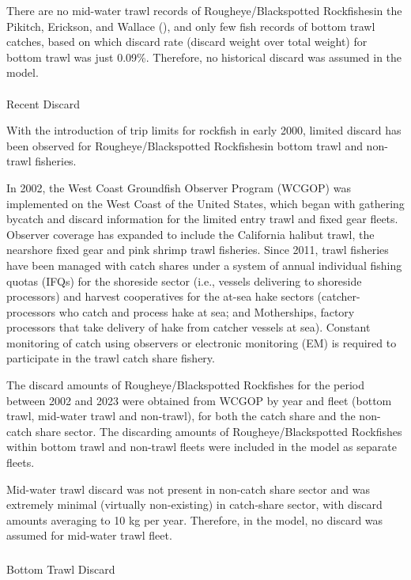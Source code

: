 \documentclass[
]{scrartcl}
\makeatletter
\let\oldparagraph\paragraph
\renewcommand{\paragraph}{
    \@ifstar
      \xxxParagraphStar
      \xxxParagraphNoStar
  }
\newcommand{\xxxParagraphStar}[1]{\oldparagraph*{#1}\mbox{}}
\newcommand{\xxxParagraphNoStar}[1]{\oldparagraph{#1}\mbox{}}
\let\oldsubparagraph\subparagraph
\renewcommand{\subparagraph}{
    \@ifstar
      \xxxSubParagraphStar
      \xxxSubParagraphNoStar
  }
\newcommand{\xxxSubParagraphStar}[1]{\oldsubparagraph*{#1}\mbox{}}
\newcommand{\xxxSubParagraphNoStar}[1]{\oldsubparagraph{#1}\mbox{}}
\makeatother
\begin{document}
There are no mid-water trawl records of Rougheye/Blackspotted
Rockfishesin the Pikitch, Erickson, and Wallace
(), and only few fish
records of bottom trawl catches, based on which discard rate (discard
weight over total weight) for bottom trawl was just 0.09\%. Therefore,
no historical discard was assumed in the model.

\paragraph{Recent Discard}\label{recent-discard}

With the introduction of trip limits for rockfish in early 2000, limited
discard has been observed for Rougheye/Blackspotted Rockfishesin bottom
trawl and non-trawl fisheries.

In 2002, the West Coast Groundfish Observer Program (WCGOP) was
implemented on the West Coast of the United States, which began with
gathering bycatch and discard information for the limited entry trawl
and fixed gear fleets. Observer coverage has expanded to include the
California halibut trawl, the nearshore fixed gear and pink shrimp trawl
fisheries. Since 2011, trawl fisheries have been managed with catch
shares under a system of annual individual fishing quotas (IFQs) for the
shoreside sector (i.e., vessels delivering to shoreside processors) and
harvest cooperatives for the at-sea hake sectors (catcher-processors who
catch and process hake at sea; and Motherships, factory processors that
take delivery of hake from catcher vessels at sea). Constant monitoring
of catch using observers or electronic monitoring (EM) is required to
participate in the trawl catch share fishery.

The discard amounts of Rougheye/Blackspotted Rockfishes for the period
between 2002 and 2023 were obtained from WCGOP by year and fleet (bottom
trawl, mid-water trawl and non-trawl), for both the catch share and the
non-catch share sector. The discarding amounts of Rougheye/Blackspotted
Rockfishes within bottom trawl and non-trawl fleets were included in the
model as separate fleets.

Mid-water trawl discard was not present in non-catch share sector and
was extremely minimal (virtually non-existing) in catch-share sector,
with discard amounts averaging to 10 kg per year. Therefore, in the
model, no discard was assumed for mid-water trawl fleet.

\subparagraph{Bottom Trawl Discard}\label{bottom-trawl-discard}
\end{document}
